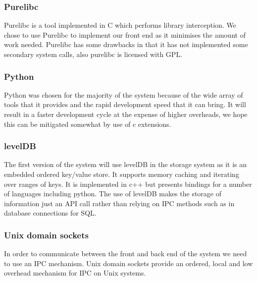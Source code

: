 \subsubsection{Purelibc}
\label{PureLCJust}
Purelibc is a tool implemented in C which performs library interception. We chose to use Purelibc to implement our front end as it minimises the amount of work needed. Purelibc has some drawbacks in that it has not implemented some secondary system calls, also purelibc is licensed with GPL.
\subsubsection{Python}
Python was chosen for the majority of the system because of the wide array of tools that it provides and the rapid development speed that it can bring. It will result in a faster development cycle at the expense of higher overheads, we hope this can be mitigated somewhat by use of c extensions.
\subsubsection{levelDB}
\label{levelDBJust}
The first version of the system will use levelDB in the storage system as it is an embedded ordered key/value store. It supports memory caching and iterating over ranges of keys. It is implemented in c++ but presents bindings for a number of languages including python. The use of levelDB makes the storage of information just an API call rather than relying on IPC methods such as in database connections for SQL.
\subsubsection{Unix domain sockets}
In order to communicate between the front and back end of the system we need to use an IPC mechanism. Unix domain sockets provide an ordered, local and low overhead mechanism for IPC on Unix systems. 
